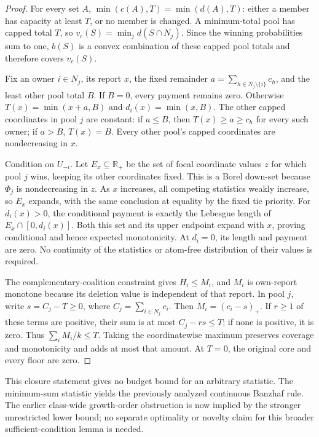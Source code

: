 \documentclass[11pt]{article}
\theoremstyle{definition}\newtheorem{definition}[theorem]{Definition}
\theoremstyle{remark}\newtheorem{remark}[theorem]{Remark}
\newcommand{\R}{\mathbb R}
\begin{document}
\begin{proof}
For every set $A$, $\min(c(A),T)=\min(d(A),T)$: either a member has
capacity at least $T$, or no member is changed. A minimum-total pool
has capped total $T$, so $v_c(S)=\min_jd(S\cap N_j)$.
Since the winning probabilities sum to one, $b(S)$ is a convex combination
of these capped pool totals and therefore covers $v_c(S)$.

Fix an owner $i\in N_j$, its report $x$, the fixed remainder
$a=\sum_{h\in N_j\setminus\{i\}}c_h$, and the least other pool total
$B$. If $B=0$, every payment remains zero. Otherwise
$T(x)=\min(x+a,B)$ and $d_i(x)=\min(x,B)$.
The other capped coordinates in pool $j$ are constant: if $a\le B$,
then $T(x)\ge a\ge c_h$ for every such owner; if $a>B$, $T(x)=B$.
Every other pool's capped coordinates are nondecreasing in $x$.

Condition on $U_{-i}$. Let $E_x\subseteq\R_+$ be the set of focal
coordinate values $z$ for which pool $j$ wins, keeping its other coordinates
fixed. This is a Borel down-set because $\Phi_j$ is nondecreasing in $z$.
As $x$ increases, all competing statistics weakly increase, so $E_x$
expands, with the same conclusion at equality by the fixed tie priority.
For $d_i(x)>0$, the conditional payment is exactly the Lebesgue length
of $E_x\cap[0,d_i(x)]$. Both this set and its upper endpoint expand with
$x$, proving conditional and hence expected monotonicity. At $d_i=0$,
its length and payment are zero. No continuity of the statistics or
atom-free distribution of their values is required.

The complementary-coalition constraint gives $H_i\le M_i$, and
$M_i$ is own-report monotone because its deletion value is independent
of that report. In pool $j$, write $s=C_j-T\ge0$, where
$C_j=\sum_{i\in N_j}c_i$. Then $M_i=(c_i-s)_+$.
If $r\ge1$ of these terms are positive, their sum is at most
$C_j-rs\le T$; if none is positive, it is zero.
Thus $\sum_iM_i/k\le T$. Taking the coordinatewise maximum preserves
coverage and monotonicity and adds at most that amount. At $T=0$, the
original core and every floor are zero.
\end{proof}
This closure statement gives no budget bound for an arbitrary statistic.
The minimum-sum statistic yields the previously analyzed continuous
Banzhaf rule. The earlier class-wide growth-order obstruction is now
implied by the stronger unrestricted lower bound; no separate optimality
or novelty claim for this broader sufficient-condition lemma is needed.
\end{document}

